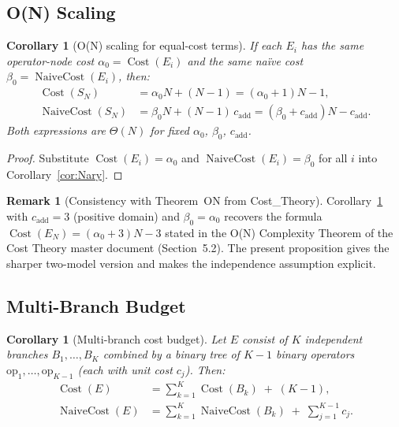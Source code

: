 \documentclass[12pt,a4paper]{article}
\newtheorem{corollary}[theorem]{Corollary}
\theoremstyle{definition}
\newtheorem{remark}[theorem]{Remark}
\newcommand{\Cost}{\operatorname{Cost}}
\newcommand{\NC}{\operatorname{NaiveCost}}
\begin{document}
\subsection{O(N) Scaling}

\begin{corollary}[O(N) scaling for equal-cost terms]
\label{cor:ON}
If each $E_i$ has the same operator-node cost $\alpha_0 = \Cost(E_i)$ and the
same na\"{i}ve cost $\beta_0 = \NC(E_i)$, then:
\begin{align}
  \Cost(S_N)
    &= \alpha_0 N + (N-1)
     = (\alpha_0 + 1)N - 1,
  \label{eq:ON-Cost} \\[4pt]
  \NC(S_N)
    &= \beta_0 N + (N-1)\,c_{\mathrm{add}}
     = (\beta_0 + c_{\mathrm{add}})N - c_{\mathrm{add}}.
  \label{eq:ON-NC}
\end{align}
Both expressions are $\Theta(N)$ for fixed $\alpha_0$, $\beta_0$,
$c_{\mathrm{add}}$.
\end{corollary}

\begin{proof}
Substitute $\Cost(E_i) = \alpha_0$ and $\NC(E_i) = \beta_0$ for all $i$ into
Corollary~\ref{cor:Nary}.
\end{proof}

\begin{remark}[Consistency with Theorem~ON from Cost\_Theory]
\label{rem:consistency}
Corollary~\ref{cor:ON} with $c_{\mathrm{add}} = 3$ (positive domain) and
$\beta_0 = \alpha_0$ recovers the formula $\Cost(E_N) = (\alpha_0 + 3)N - 3$
stated in the O(N) Complexity Theorem of the Cost Theory master document
(Section~5.2).  The present proposition gives the sharper two-model version
and makes the independence assumption explicit.
\end{remark}

\subsection{Multi-Branch Budget}

\begin{corollary}[Multi-branch cost budget]
\label{cor:branches}
Let $E$ consist of $K$ independent branches $B_1, \ldots, B_K$ combined by a
binary tree of $K-1$ binary operators $\mathrm{op}_1, \ldots, \mathrm{op}_{K-1}$
(each with unit cost $c_j$).  Then:
\begin{align}
  \Cost(E)
    &= \sum_{k=1}^{K} \Cost(B_k) \;+\; (K-1),
  \label{eq:branches-Cost} \\[4pt]
  \NC(E)
    &= \sum_{k=1}^{K} \NC(B_k) \;+\; \sum_{j=1}^{K-1} c_j.
  \label{eq:branches-NC}
\end{align}
\end{corollary}
\end{document}
